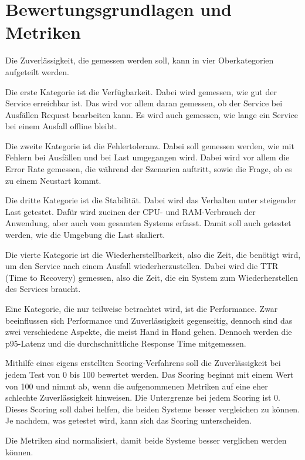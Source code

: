 \section{Bewertungsgrundlagen und Metriken}
Die Zuverlässigkeit, die gemessen werden soll, kann in vier Oberkategorien aufgeteilt werden.

Die erste Kategorie ist die Verfügbarkeit. Dabei wird gemessen, wie gut der Service erreichbar ist. Das wird vor allem daran gemessen, ob der Service bei Ausfällen Request bearbeiten kann.
Es wird auch gemessen, wie lange ein Service bei einem Ausfall offline bleibt.
 
Die zweite Kategorie ist die Fehlertoleranz. Dabei soll gemessen werden, wie mit Fehlern bei Ausfällen und bei Last umgegangen wird.
Dabei wird vor allem die Error Rate gemessen, die während der Szenarien auftritt, sowie die Frage, ob es zu einem Neustart kommt.

Die dritte Kategorie ist die Stabilität. Dabei wird das Verhalten unter steigender Last getestet.
Dafür wird zueinen der CPU- und RAM-Verbrauch der Anwendung, aber auch vom gesamten Systems erfasst. Damit soll auch getestet werden, wie die Umgebung die Last skaliert.

Die vierte Kategorie ist die Wiederherstellbarkeit, also die Zeit, die benötigt wird, um den Service nach einem Ausfall wiederherzustellen.
Dabei wird die TTR (Time to Recovery) gemessen, also die Zeit, die ein System zum Wiederherstellen des Services braucht.

Eine Kategorie, die nur teilweise betrachtet wird, ist die Performance. Zwar beeinflussen sich Performance und Zuverlässigkeit gegenseitig, dennoch sind das zwei verschiedene Aspekte, die meist Hand in Hand gehen.
Dennoch werden die p95-Latenz und die durchschnittliche Response Time mitgemessen.

Mithilfe eines eigens erstellten Scoring-Verfahrens soll die Zuverlässigkeit bei jedem Test von 0 bis 100 bewertet werden.
Das Scoring beginnt mit einem Wert von 100 und nimmt ab, wenn die aufgenommenen Metriken auf eine eher schlechte Zuverlässigkeit hinweisen. Die Untergrenze bei jedem Scoring ist 0.
Dieses Scoring soll dabei helfen, die beiden Systeme besser vergleichen zu können. Je nachdem, was getestet wird, kann sich das Scoring unterscheiden.

Die Metriken sind normalisiert, damit beide Systeme besser verglichen werden können.